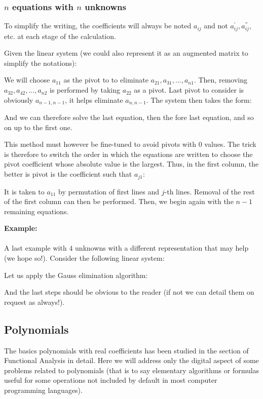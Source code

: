 		\pagebreak
		\subsubsection{$n$ equations with $n$ unknowns}
	
		To simplify the writing, the coefficients will always be noted $a_{ij}$ and not $a_{ij}^{'},a_{ij}^{''}$, etc. at each stage of the calculation.
		
		Given the linear system (we could also represent it as an augmented matrix to simplify the notations):
		
We will choose $a_{11}$ as the pivot to to eliminate $a_{21},a_{31},...,a_{n1}$. Then, removing $a_{32},a_{42},...,a_{n2}$ is performed by taking $a_{22}$ as a pivot. Last pivot to consider is obviously $a_{n-1,n-1}$, it helps eliminate $a_{n,n-1}$. The system then takes the form:
		
		And we can therefore solve the last equation, then the fore last equation, and so on up to the first one.
		
		This method must however be fine-tuned to avoid pivots with $0$ values. The trick is therefore to switch the order in which the equations are written to choose the pivot coefficient whose absolute value is the largest. Thus, in the first column, the better is pivot is the coefficient such that $a_{j1}$:
		
It is taken to $a_{11}$ by permutation of first lines and $j$-th lines. Removal of the rest of the first column can then be performed. Then, we begin again with the $n-1$ remaining equations.

	\begin{tcolorbox}[colframe=black,colback=white,sharp corners]
	\textbf{{\Large {}}Example:}\\\\
	A last example with $4$ unknowns with a different representation that may help (we hope so!). Consider the following linear system:
	
	Let us apply the Gauss elimination algorithm:
	
	And the last steps should be obvious to the reader (if not we can detail them on request as always!).
	\end{tcolorbox}

	\pagebreak
	\subsection{Polynomials}
	The basics polynomials with real coefficients has been studied in the section of Functional Analysis in detail. Here we will address only the digital aspect of some problems related to polynomials (that is to say elementary algorithms or formulas useful for some operations not included by default in most computer programming languages).
	
